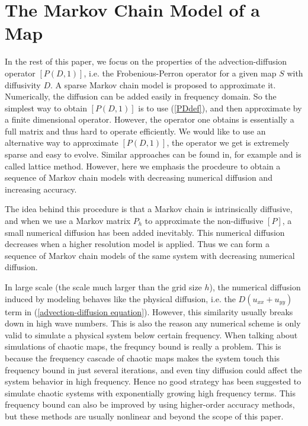 \documentclass{article}
\begin{document}
\section{The Markov Chain Model of a Map}
\label{The Markov Chain Model of a Map}
In the rest of this paper, we focus on the properties of the advection-diffusion operator $[P(D,1)]$, i.e. the Frobenious-Perron operator for a given map $S$ with diffusivity $D$. A sparse Markov chain model is proposed to approximate it. Numerically, the diffusion can be added easily in frequency domain. So the simplest way to obtain $[P(D,1)]$ is to use (\ref{PDdef}), and then approximate by a finite dimensional operator. However, the operator one obtains is essentially a full matrix and thus hard to operate efficiently. We would like to use an alternative way to approximate $[P(D,1)]$, the operator we get is extremely sparse and easy to evolve. Similar approaches can be found in, for example \cite{Pierrehumbert2000}\cite{Tsang2005} and is called lattice method. However, here we emphasis the procdeure to obtain a sequence of Markov chain models with decreasing numerical diffusion and increasing accuracy. 




The idea behind this procedure is that a Markov chain is intrinsically diffusive, and when we use a Markov matrix $P_h$ to
approximate the non-diffusive $[P]$, a small numerical diffusion has been added inevitably. This numerical diffusion decreases when a higher resolution model is applied. Thus we can form a sequence of Markov chain models of the same system with decreasing numerical diffusion.  


In large scale (the scale much larger than the grid size $h$), the numerical diffusion induced by modeling behaves like the physical diffusion, i.e. the $D(u_{xx}+u_{yy})$ term in (\ref{advection-diffusion equation}). However, this similarity usually breaks down in high wave numbers. This is also the reason any numerical scheme is only valid to simulate a physical system below certain frequency. When talking about simulations of chaotic maps, the frequncy bound is really a problem. This is because the frequency cascade of chaotic maps makes the system touch this frequency bound in just several iterations, and even tiny diffusion could affect the system behavior in high frequency. Hence no good strategy has been suggested to simulate chaotic systems with exponentially growing high frequency terms. This frequency bound can also be improved by using higher-order accuracy methods, but these methods are usually nonlinear and beyond the scope of this paper.  
\end{document}
